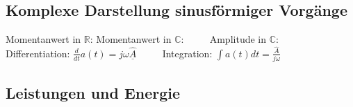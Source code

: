 	\subsection{Komplexe Darstellung sinusförmiger Vorgänge}
	Momentanwert in $\mathbb{R}$:  \qquad
	Momentanwert in $\mathbb{C}$:  $\qquad$ 
	Amplitude in $\mathbb{C}$: \\
	
	Differentiation: $\frac{d}{dt} a(t) = j \omega \underline{\hat{A}}$ $\qquad$ 
	Integration: $\int a(t) dt = \frac{\hat{A}}{j \omega}$
	
	\subsection{Leistungen und Energie}

